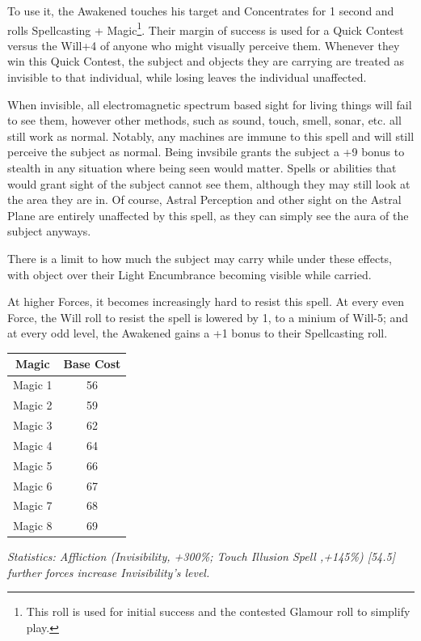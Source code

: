 \begin{multicols*}{3}
	To use it, the Awakened touches his target and Concentrates for 1 second and rolls Spellcasting + Magic\footnote{This roll is used for initial success and the contested Glamour roll to simplify play.}. Their margin of success is used for a Quick Contest versus the Will+4 of anyone who might visually perceive them. Whenever they win this Quick Contest, the subject and objects they are carrying are treated as invisible to that individual, while losing leaves the individual unaffected.
	
	When invisible, all electromagnetic spectrum based sight for living things will fail to see them, however other methods, such as sound, touch, smell, sonar, etc. all still work as normal. Notably, any machines are immune to this spell and will still perceive the subject as normal. Being invsibile grants the subject a +9 bonus to stealth in any situation where being seen would matter. Spells or abilities that would grant sight of the subject cannot see them, although they may still look at the area they are in. Of course, Astral Perception and other sight on the Astral Plane are entirely unaffected by this spell, as they can simply see the aura of the subject anyways.
	
	There is a limit to how much the subject may carry while under these effects, with object over their Light Encumbrance becoming visible while carried.
	
	At higher Forces, it becomes increasingly hard to resist this spell. At every even Force, the Will roll to resist the spell is lowered by 1, to a minium of Will-5; and at every odd level, the Awakened gains a +1 bonus to their Spellcasting roll.
		
	\begin{center}
		\begin{tabular}{|c|c|}
			\hline
			Magic & Base Cost \\
			\hline
			\hline
			Magic 1 & 56 \\
			Magic 2 & 59 \\
			Magic 3 & 62 \\
			Magic 4 & 64 \\
			Magic 5 & 66 \\
			Magic 6 & 67 \\
			Magic 7 & 68 \\
			Magic 8 & 69 \\
			\hline
		\end{tabular}
	\end{center}
	
	\textcolor{OliveGreen}{\textit{Statistics: Affliction (Invisibility, +300\%; Touch Illusion Spell ,+145\%) [54.5]  further forces increase Invisibility's level. }}
	

\end{multicols*}

